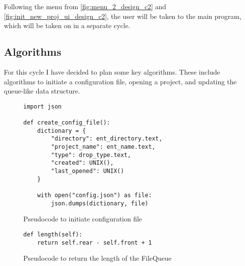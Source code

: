         Following the menu from \autoref{fig:menu_2_design_c2} and \autoref{fig:init_new_proj_ui_design_c2}, the user will be taken to the main program, which will be taken on in a separate cycle.


    \subsection{Algorithms}

        For this cycle I have decided to plan some key algorithms. These include algorithms to initiate a configuration file, opening a project, and updating the queue-like data structure.

        \begin{figure}[!ht]
            \begin{verbatim}
import json

def create_config_file():
    dictionary = {
        "directory": ent_directory.text,
        "project_name": ent_name.text,
        "type": drop_type.text,
        "created": UNIX(),
        "last_opened": UNIX()
    }

    with open("config.json") as file:
        json.dumps(dictionary, file)
            \end{verbatim}
            \caption{Pseudocode to initiate configuration file}
            \label{pc:init_config_file_c2}
        \end{figure}




        \newpage

        \begin{figure}[!ht]
            \begin{verbatim}
def length(self):
    return self.rear - self.front + 1
            \end{verbatim}
            \caption{Pseudocode to return the length of the FileQueue}
            \label{pc:fileq-length-method}
        \end{figure}

